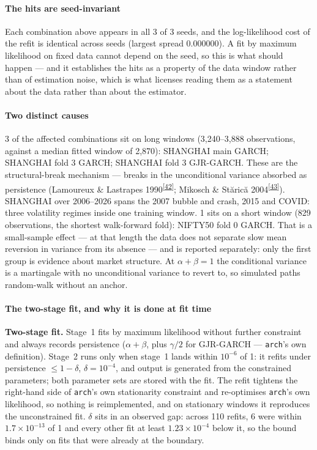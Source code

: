 \documentclass[11pt,a4paper]{article}
\makeatletter
\newcommand{\tcite}[1]{\textsuperscript{[\hyperlink{R:#1}{#1}]}}
\DeclareRobustCommand{\_}{\ifmmode\nfss@text{\textunderscore}\else\textunderscore\allowbreak\fi}
\makeatother
\begin{document}
\paragraph{The hits are seed-invariant} Each combination above appears in all 3 of 3 seeds, and the log-likelihood cost of the refit is identical across seeds (largest spread 0.000000). A fit by maximum likelihood on fixed data cannot depend on the seed, so this is what should happen --- and it establishes the hits as a property of the data window rather than of estimation noise, which is what licenses reading them as a statement about the data rather than about the estimator.

\paragraph{Two distinct causes} 3 of the affected combinations sit on long windows (3,240--3,888 observations, against a median fitted window of 2,870): SHANGHAI main GARCH; SHANGHAI fold 3 GARCH; SHANGHAI fold 3 GJR-GARCH. These are the structural-break mechanism --- breaks in the unconditional variance absorbed as persistence (Lamoureux \& Lastrapes 1990\tcite{42}; Mikosch \& St\u{a}ric\u{a} 2004\tcite{43}). SHANGHAI over 2006--2026 spans the 2007 bubble and crash, 2015 and COVID: three volatility regimes inside one training window. 1 sits on a short window (829 observations, the shortest walk-forward fold): NIFTY50 fold 0 GARCH. That is a small-sample effect --- at that length the data does not separate slow mean reversion in variance from its absence --- and is reported separately: only the first group is evidence about market structure. At $\alpha+\beta=1$ the conditional variance is a martingale with no unconditional variance to revert to, so simulated paths random-walk without an anchor.

\paragraph{The two-stage fit, and why it is done at fit time} \textbf{Two-stage fit.} Stage~1 fits by maximum likelihood without further constraint and always records persistence ($\alpha+\beta$, plus $\gamma/2$ for GJR-GARCH --- \texttt{arch}'s own definition). Stage~2 runs only when stage~1 lands within $10^{-6}$ of 1: it refits under persistence $\le 1-\delta$, $\delta=10^{-4}$, and output is generated from the constrained parameters; both parameter sets are stored with the fit. The refit tightens the right-hand side of \texttt{arch}'s own stationarity constraint and re-optimises \texttt{arch}'s own likelihood, so nothing is reimplemented, and on stationary windows it reproduces the unconstrained fit. $\delta$ sits in an observed gap: across 110 refits, 6 were within $1.7\times10^{-13}$ of 1 and every other fit at least $1.23\times10^{-4}$ below it, so the bound binds only on fits that were already at the boundary.
\end{document}
